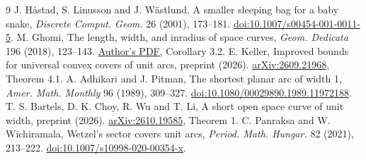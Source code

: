 \begingroup\small
\begin{thebibliography}{9}\setlength{\itemsep}{1pt}
 J. H\aa stad, S. Linusson and J. W\"astlund, A smaller sleeping bag for a baby snake, \emph{Discrete Comput. Geom.} 26 (2001), 173--181. \href{https://doi.org/10.1007/s00454-001-0011-5}{doi:10.1007/s00454-001-0011-5}.
 M. Ghomi, The length, width, and inradius of space curves, \emph{Geom. Dedicata} 196 (2018), 123--143. \href{https://ghomi.math.gatech.edu/Papers/inradius.pdf}{Author's PDF}, Corollary 3.2.
 E. Keller, Improved bounds for universal convex covers of unit arcs, preprint (2026). \href{https://arxiv.org/abs/2609.21968}{arXiv:2609.21968}, Theorem 4.1.
 A. Adhikari and J. Pitman, The shortest planar arc of width 1, \emph{Amer. Math. Monthly} 96 (1989), 309--327. \href{https://doi.org/10.1080/00029890.1989.11972188}{doi:10.1080/00029890.1989.11972188}.
 T. S. Bartels, D. K. Choy, R. Wu and T. Li, A short open space curve of unit width, preprint (2026). \href{https://arxiv.org/abs/2610.19585}{arXiv:2610.19585}, Theorem 1.
 C. Panraksa and W. Wichiramala, Wetzel's sector covers unit arcs, \emph{Period. Math. Hungar.} 82 (2021), 213--222. \href{https://doi.org/10.1007/s10998-020-00354-x}{doi:10.1007/s10998-020-00354-x}.
\end{thebibliography}\endgroup
